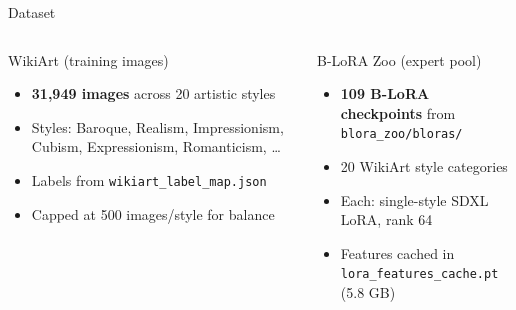 \documentclass[aspectratio=169,10pt]{beamer}
\begin{document}
\begin{frame}[shrink=10]{Dataset}
  \begin{columns}[T]
      \begin{block}{WikiArt (training images)}
        \begin{itemize}
          \item \textbf{31,949 images} across 20 artistic styles
          \item Styles: Baroque, Realism, Impressionism, Cubism, Expressionism, Romanticism, \ldots
          \item Labels from \texttt{wikiart\_label\_map.json}
          \item Capped at 500 images/style for balance
        \end{itemize}
      \end{block}
      \vspace{0.5em}
      \begin{block}{B-LoRA Zoo (expert pool)}
        \begin{itemize}
          \item \textbf{109 B-LoRA checkpoints} from \texttt{blora\_zoo/bloras/}
          \item 20 WikiArt style categories
          \item Each: single-style SDXL LoRA, rank 64
          \item Features cached in \texttt{lora\_features\_cache.pt} (5.8 GB)
        \end{itemize}
      \end{block}


\end{columns}
\end{frame}
\end{document}
